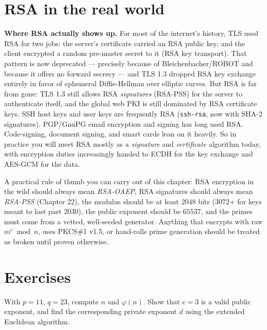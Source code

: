 \section{RSA in the real world}
\label{ch19:realworld}

\begin{applicationbox}
\textbf{Where RSA actually shows up.} For most of the internet's history, TLS used RSA for two jobs: the server's certificate carried an RSA public key, and the client encrypted a random pre-master secret to it (RSA key transport). That pattern is now deprecated --- precisely because of Bleichenbacher/ROBOT and because it offers no forward secrecy --- and TLS 1.3 dropped RSA key exchange entirely in favor of ephemeral Diffie-Hellman over elliptic curves. But RSA is far from gone: TLS 1.3 still allows RSA \emph{signatures} (RSA-PSS) for the server to authenticate itself, and the global web PKI is still dominated by RSA certificate keys. SSH host keys and user keys are frequently RSA (\texttt{ssh-rsa}, now with SHA-2 signatures). PGP/GnuPG email encryption and signing has long used RSA. Code-signing, document signing, and smart cards lean on it heavily. So in practice you will meet RSA mostly as a \emph{signature} and \emph{certificate} algorithm today, with encryption duties increasingly handed to ECDH for the key exchange and AES-GCM for the data.
\end{applicationbox}

\begin{focusbox}
A practical rule of thumb you can carry out of this chapter: RSA encryption in the wild should always mean \emph{RSA-OAEP}, RSA signatures should always mean \emph{RSA-PSS} (Chapter 22), the modulus should be at least $2048$ bits ($3072$+ for keys meant to last past 2030), the public exponent should be $65537$, and the primes must come from a vetted, well-seeded generator. Anything that encrypts with raw $m^e\bmod n$, uses PKCS\#1 v1.5, or hand-rolls prime generation should be treated as broken until proven otherwise.
\end{focusbox}

\section{Exercises}
\label{ch19:exercises}

\begin{exercise}
With $p=11$, $q=23$, compute $n$ and $\varphi(n)$. Show that $e=3$ is a valid public exponent, and find the corresponding private exponent $d$ using the extended Euclidean algorithm.
\end{exercise}

